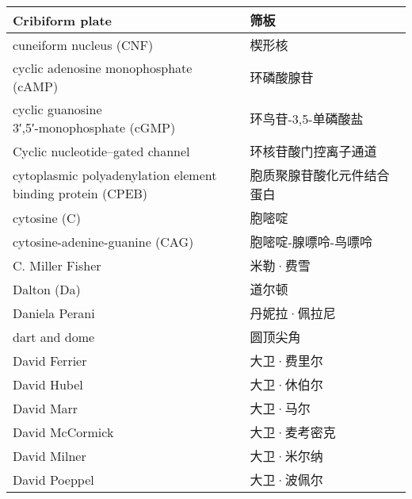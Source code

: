 \begin{longtable}{lll}
	\midrule
	Cribiform plate     &&  筛板  \\
	
	\midrule
	cuneiform nucleus (CNF)     &&  楔形核  \\
	
	\midrule
	cyclic adenosine monophosphate (cAMP)     &&  环磷酸腺苷  \\
	
	\midrule
	\makecell{cyclic guanosine \\ 3′,5′-monophosphate (cGMP)}     &&  环鸟苷-3,5-单磷酸盐  \\
	
	\midrule
	Cyclic nucleotide–gated channel    &&  环核苷酸门控离子通道  \\
	
	\midrule
	\makecell{cytoplasmic polyadenylation element \\ binding protein  (CPEB)}   &&  胞质聚腺苷酸化元件结合蛋白  \\
	
	\midrule
	cytosine (C)     &&  胞嘧啶  \\
	
	\midrule
	cytosine-adenine-guanine (CAG)     &&  胞嘧啶-腺嘌呤-鸟嘌呤  \\
	
	\midrule
	C. Miller Fisher     &&  米勒·费雪  \\
	
	\midrule
	Dalton (Da)   &&  道尔顿  \\
	
	\midrule
	Daniela Perani     &&  丹妮拉·佩拉尼  \\
	
	\midrule
	dart and dome     &&  圆顶尖角  \\
	
	\midrule
	David Ferrier     &&  大卫·费里尔  \\
	
	\midrule
	David Hubel     &&  大卫·休伯尔  \\
	
	\midrule
	David Marr     &&  大卫·马尔  \\
	
	\midrule
	David McCormick     &&  大卫·麦考密克  \\
	
	\midrule
	David Milner     &&  大卫·米尔纳  \\
	
	\midrule
	David Poeppel     &&  大卫·波佩尔  \\
	

\end{longtable}
